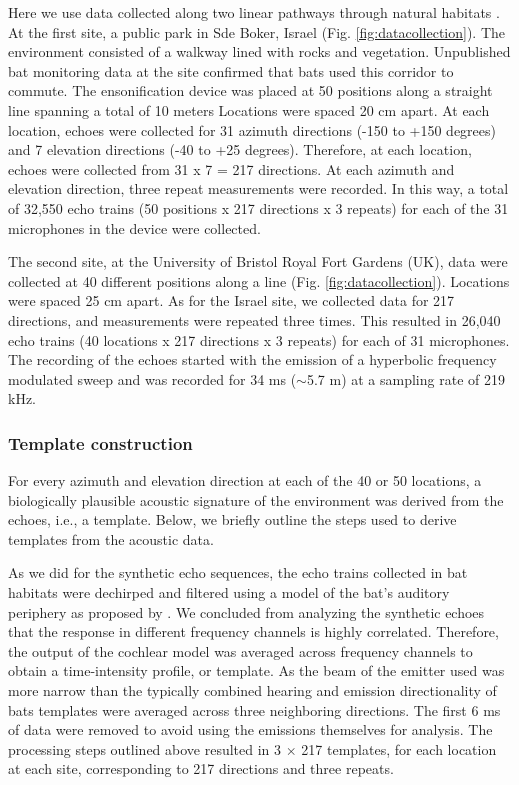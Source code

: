 \documentclass[preprint,5p]{elsarticle}
\begin{document}
Here we use data collected along two linear pathways through natural habitats \citep{Vanderelst2016}. At the first site, a public park in Sde Boker, Israel (Fig. \ref{fig:datacollection}). The environment consisted of a walkway lined with rocks and vegetation. Unpublished bat monitoring data at the site confirmed that bats used this corridor to commute. The ensonification device was placed at 50 positions along a straight line spanning a total of 10 meters Locations were spaced 20 cm apart. At each location, echoes were collected for 31 azimuth directions (-150 to +150 degrees) and 7 elevation directions (-40 to +25 degrees). Therefore, at each location, echoes were collected from 31 x 7 = 217 directions. At each azimuth and elevation direction, three repeat measurements were recorded. In this way, a total of 32,550 echo trains (50 positions x 217 directions x 3 repeats) for each of the 31 microphones in the device were collected.

The second site, at the University of Bristol Royal Fort Gardens (UK), data were collected at 40 different positions along a line (Fig. \ref{fig:datacollection}). Locations were spaced 25 cm apart. As for the Israel site, we collected data for 217 directions, and measurements were repeated three times. This resulted in 26,040 echo trains (40 locations x 217 directions x 3 repeats) for each of 31 microphones. The recording of the echoes started with the emission of a hyperbolic frequency modulated sweep and was recorded for 34 ms ($\sim$5.7 m) at a sampling rate of 219 kHz. 

\subsubsection{Template construction}

For every azimuth and elevation direction at each of the  40 or 50 locations, a biologically plausible acoustic signature of the environment was derived from the echoes, i.e., a template. Below, we briefly outline the steps used to derive templates from the acoustic data.

As we did for the synthetic echo sequences, the echo trains collected in bat habitats were dechirped and filtered using a model of the bat's auditory periphery as proposed by \citet{Wiegrebe2008}. We concluded from analyzing the synthetic echoes that the response in different frequency channels is highly correlated. Therefore, the output of the cochlear model was averaged across frequency channels to obtain a time-intensity profile, or template. As the beam of the emitter used was more narrow than the typically combined hearing and emission directionality of bats \citep{Vanderelst2010a,Reijniers2010,Jakobsen2012} templates were averaged across three neighboring directions. The first 6 ms of data were removed to avoid using the emissions themselves for analysis. The processing steps outlined above resulted in 3 $\times$ 217 templates, for each location at each site, corresponding to 217 directions and three repeats.
\end{document}
